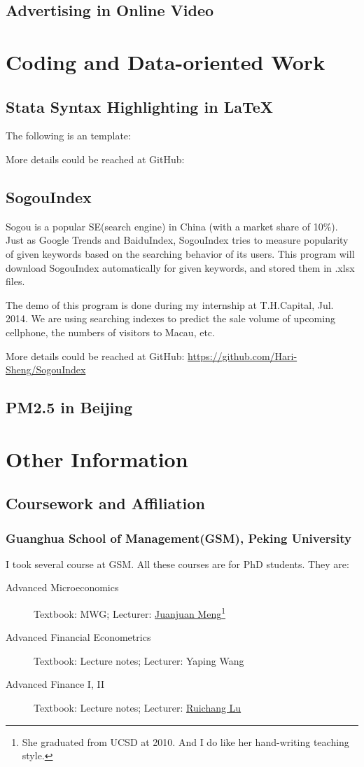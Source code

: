 \documentclass{article}
\begin{document}
\subsection{Advertising in Online Video}

\newpage
\section{Coding and Data-oriented Work}
\subsection{Stata Syntax Highlighting in \LaTeX}
The following is an template:

More details could be reached at GitHub:
\subsection{SogouIndex}
Sogou is a popular SE(search engine) in China (with a market share of 10\%). Just as Google Trends and BaiduIndex, SogouIndex tries to measure popularity of given keywords based on the searching behavior of its users. This program will download SogouIndex automatically for given keywords, and stored them in .xlsx files.

The demo of this program is done during my internship at T.H.Capital, Jul. 2014. We are using searching indexes to predict the sale volume of upcoming cellphone, the numbers of visitors to Macau, etc. 

More details could be reached at GitHub: \url{https://github.com/Hari-Sheng/SogouIndex}

\subsection{PM2.5 in Beijing}

\newpage
\section{Other Information}
\subsection{Coursework and Affiliation}
\subsubsection{Guanghua School of Management(GSM), Peking University}
I took several course at GSM. All these courses are for PhD students. They are: 
\begin{description}
\item[Advanced Microeconomics] Textbook: MWG; Lecturer: \href{https://ideas.repec.org/f/pme419.html}{Juanjuan Meng}\footnote{She graduated from UCSD at 2010. And I do like her hand-writing teaching style.}
\item[Advanced Financial Econometrics] Textbook: Lecture notes; Lecturer: Yaping Wang
\item[Advanced Finance I, II] Textbook: Lecture notes; Lecturer: \href{https://ideas.repec.org/f/plu286.html}{Ruichang Lu}


\end{description}
\end{document}
